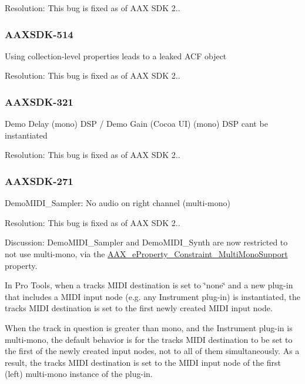Resolution\+: This bug is fixed as of A\+A\+X S\+D\+K 2..\hypertarget{a00374_AAXSDK-514}{}\subsubsection{A\+A\+X\+S\+D\+K-\/514}\label{a00374_AAXSDK-514}
Using collection-\/level properties leads to a leaked A\+C\+F object

Resolution\+: This bug is fixed as of A\+A\+X S\+D\+K 2..\hypertarget{a00374_AAXSDK-321}{}\subsubsection{A\+A\+X\+S\+D\+K-\/321}\label{a00374_AAXSDK-321}
Demo Delay (mono) D\+S\+P / Demo Gain (Cocoa U\+I) (mono) D\+S\+P can\textquotesingle{}t be instantiated

Resolution\+: This bug is fixed as of A\+A\+X S\+D\+K 2..\hypertarget{a00374_AAXSDK-271}{}\subsubsection{A\+A\+X\+S\+D\+K-\/271}\label{a00374_AAXSDK-271}
Demo\+M\+I\+D\+I\+\_\+\+Sampler\+: No audio on right channel (multi-\/mono)

Resolution\+: This bug is fixed as of A\+A\+X S\+D\+K 2..

Discussion\+: Demo\+M\+I\+D\+I\+\_\+\+Sampler and Demo\+M\+I\+D\+I\+\_\+\+Synth are now restricted to not use multi-\/mono, via the \hyperlink{a00283_a6571f4e41a5dd06e4067249228e2249ea83f671685958bdc668ef574d5a2d92b0}{A\+A\+X\+\_\+e\+Property\+\_\+\+Constraint\+\_\+\+Multi\+Mono\+Support} property.

In Pro Tools, when a track\textquotesingle{}s M\+I\+D\+I destination is set to \char`\"{}none\char`\"{} and a new plug-\/in that includes a M\+I\+D\+I input node (e.\+g. any Instrument plug-\/in) is instantiated, the track\textquotesingle{}s M\+I\+D\+I destination is set to the first newly created M\+I\+D\+I input node.

When the track in question is greater than mono, and the Instrument plug-\/in is multi-\/mono, the default behavior is for the track\textquotesingle{}s M\+I\+D\+I destination to be set to the first of the newly created input nodes, not to all of them simultaneously. As a result, the track\textquotesingle{}s M\+I\+D\+I destination is set to the M\+I\+D\+I input node of the first (left) multi-\/mono instance of the plug-\/in.

